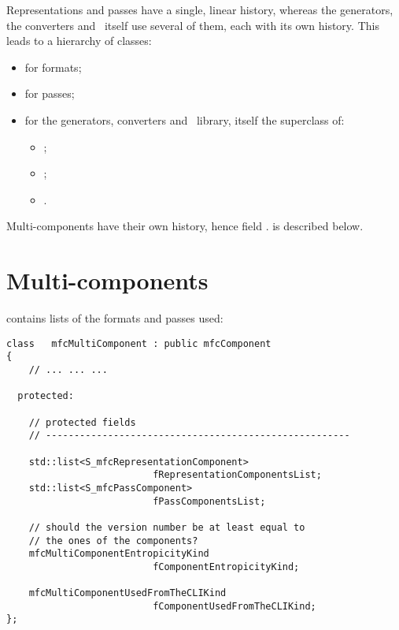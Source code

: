 Representations and passes have a single, linear history, whereas the generators, the converters and \mf\ itself use several of them, each with its own history. This leads to a hierarchy of classes:
\begin{itemize}
\item {} for formats;
\item {} for passes;
\item {} for the generators, converters and \mf\ library, itself the superclass  of:


\begin{itemize}
	\item {};
	\item {};
	\item {}.
	\end{itemize}

\end{itemize}

Multi-components have their own history, hence field .
 is described below.


\section{Multi-components}\label{Multi-components}

 contains lists of the formats and passes used:
\begin{lstlisting}[language=CPlusPlus]
class   mfcMultiComponent : public mfcComponent
{
	// ... ... ...

  protected:

    // protected fields
    // ------------------------------------------------------

    std::list<S_mfcRepresentationComponent>
                          fRepresentationComponentsList;
    std::list<S_mfcPassComponent>
                          fPassComponentsList;

    // should the version number be at least equal to
    // the ones of the components?
    mfcMultiComponentEntropicityKind
                          fComponentEntropicityKind;

    mfcMultiComponentUsedFromTheCLIKind
                          fComponentUsedFromTheCLIKind;
};
\end{lstlisting}

